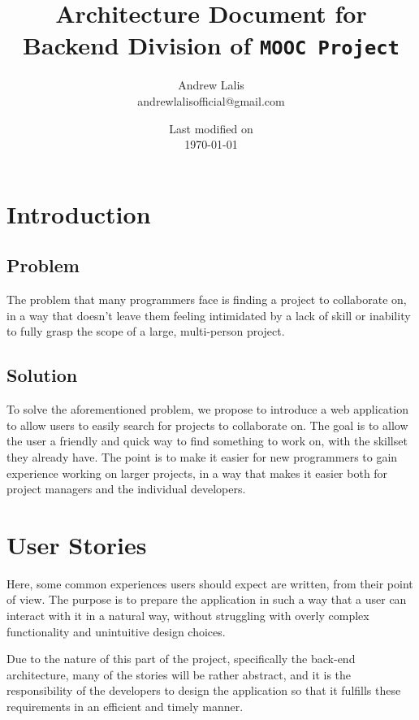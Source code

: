 \documentclass[a4paper, 12pt]{article}
\newcommand{\projectTitle}{\texttt{MOOC Project} }
\begin{document}
\title{Architecture Document for Backend Division of \projectTitle}
\author{Andrew Lalis\\ andrewlalisofficial@gmail.com}
\date{Last modified on\\ \today}
\maketitle

\setcounter{tocdepth}{3}
\tableofcontents

\section{Introduction}
	\subsection{Problem}
		The problem that many programmers face is finding a project to collaborate on, in a way that doesn't leave them feeling intimidated by a lack of skill or inability to fully grasp the scope of a large, multi-person project.

	\subsection{Solution}
		To solve the aforementioned problem, we propose to introduce a web application to allow users to easily search for projects to collaborate on. The goal is to allow the user a friendly and quick way to find something to work on, with the skillset they already have. The point is to make it easier for new programmers to gain experience working on larger projects, in a way that makes it easier both for project managers and the individual developers.

\section{User Stories}
	Here, some common experiences users should expect are written, from their point of view. The purpose is to prepare the application in such a way that a user can interact with it in a natural way, without struggling with overly complex functionality and unintuitive design choices.

	Due to the nature of this part of the project, specifically the back-end architecture, many of the stories will be rather abstract, and it is the responsibility of the developers to design the application so that it fulfills these requirements in an efficient and timely manner.
\end{document}
